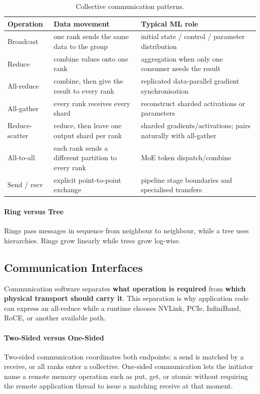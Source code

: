\begin{table}[H]
\centering
\small
\caption{Collective communication patterns.}
\label{tab:collectives}
\begin{tabularx}{\textwidth}{@{}>{\raggedright\arraybackslash}p{2.25cm}>{\raggedright\arraybackslash}X>{\raggedright\arraybackslash}X@{}}
\toprule
\textbf{Operation} & \textbf{Data movement} & \textbf{Typical ML role} \\
\midrule
Broadcast & one rank sends the same data to the group & initial state / control / parameter distribution \\
Reduce & combine values onto one rank & aggregation when only one consumer needs the result \\
All-reduce & combine, then give the result to every rank & replicated data-parallel gradient synchronisation \\
All-gather & every rank receives every shard & reconstruct sharded activations or parameters \\
Reduce-scatter & reduce, then leave one output shard per rank & sharded gradients/activations; pairs naturally with all-gather \\
All-to-all & each rank sends a different partition to every rank & MoE token dispatch/combine \\
Send / recv & explicit point-to-point exchange & pipeline stage boundaries and specialised transfers \\
\bottomrule
\end{tabularx}
\end{table}

\paragraph{Ring versus Tree}
Rings pass messages in sequence from neighbour to neighbour, while a tree uses hierarchies. 
Rings grow linearly while trees grow log-wise.

\subsection{Communication Interfaces}
\label{sec:hardware-communication-runtimes}
Communication software separates \textbf{what operation is required} from \textbf{which physical transport should carry it}.
This separation is why application code can express an all-reduce while a runtime chooses NVLink, PCIe, InfiniBand, RoCE, or another available path.

\paragraph{Two-Sided versus One-Sided}
Two-sided communication coordinates both endpoints: a send is matched by a receive, or all ranks enter a collective.
One-sided communication lets the initiator name a remote memory operation such as put, get, or atomic without requiring the remote application thread to issue a matching receive at that moment.

